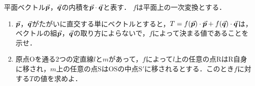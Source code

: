 \documentclass[../../main.tex]{subfiles}
\begin{document}
平面ベクトル$\va*{p}$，$\va*{q}$の内積を$\va*{p}\cdot\va*{q}$と表す．
$f$は平面上の一次変換とする．
\begin{enumerate}
  \item $\va*{p}$，$\va*{q}$がたがいに直交する単にベクトルとすると，$T=f(\va*{p})\cdot\va*{p}+f(\va*{q})\cdot\va*{q}$は，ベクトルの組$\va*{p}$，$\va*{q}$の取り方によらないで，$f$によって決まる値であることを示せ．
  \item 原点$\mathrm{O}$を通る$2$つの定直線$l$と$m$があって，$f$によって$l$上の任意の点$\mathrm{R}$は$\mathrm{R}$自身に移され，$m$上の任意の点$\mathrm{S}$は$\mathrm{OS}$の中点$\mathrm{S}'$に移されるとする．このとき$f$に対する$T$の値を求めよ．
\end{enumerate}
\end{document}
